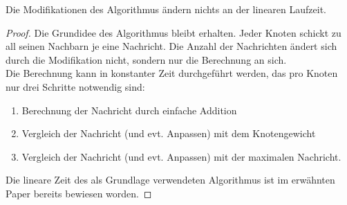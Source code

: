 	\begin{theorem}\label{thm_laufzeit_modifikation}
		Die Modifikationen des Algorithmus ändern nichts an der linearen Laufzeit.
	\end{theorem}
	\begin{proof}
		Die Grundidee des Algorithmus bleibt erhalten. Jeder Knoten schickt zu all seinen Nachbarn je eine Nachricht. Die Anzahl der Nachrichten ändert sich durch die Modifikation nicht, sondern nur die Berechnung an sich.\\Die Berechnung kann in konstanter Zeit durchgeführt werden, das pro Knoten nur drei Schritte notwendig sind:
		\begin{enumerate}
			\item Berechnung der Nachricht durch einfache Addition
			\item Vergleich der Nachricht (und evt. Anpassen) mit dem Knotengewicht
			\item Vergleich der Nachricht (und evt. Anpassen) mit der maximalen Nachricht.
		\end{enumerate}
		Die lineare Zeit des als Grundlage verwendeten Algorithmus ist im erwähnten Paper bereits bewiesen worden.
	\end{proof}



